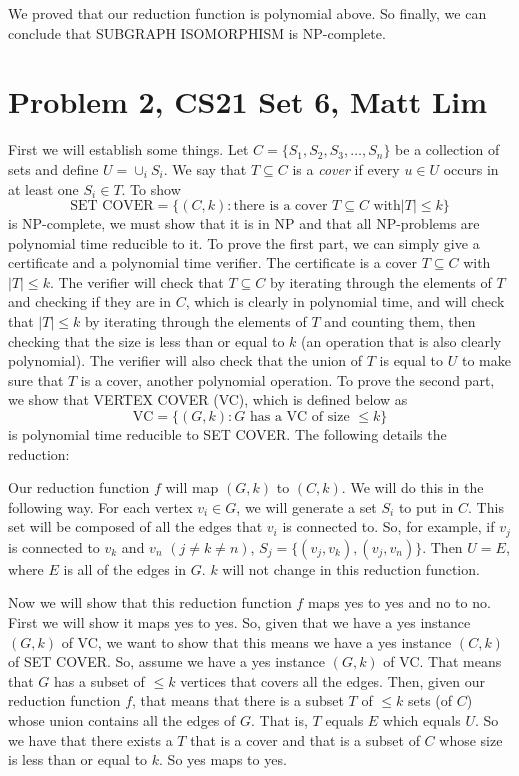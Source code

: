 \documentclass{article}
\begin{document}
We proved that our reduction function is polynomial above. So finally, we can
conclude that SUBGRAPH ISOMORPHISM is NP-complete.
\newpage

\section*{Problem 2, CS21 Set 6, Matt Lim}
First we will establish some things. Let ${C} =
\{S_1, S_2, S_3, \ldots, S_n\}$ be a collection of sets and define $U = \cup_i
S_i$.  We say that $T \subseteq {C}$ is a {\em cover} if every
$u \in U$ occurs in at least one $S_i \in T$.
To show
\[ \text{SET COVER} = \{(C,k) : \text{there is a cover $T \subseteq C$ with
$|T| \leq k$}\} \]
is NP-complete, we must show that it is in NP and that all NP-problems are
polynomial time reducible to it. To prove the first part, we can simply give
a certificate and a polynomial time verifier. The certificate is a cover
$T \subseteq C$ with $|T| \leq k$. The verifier will check that $T \subseteq C$
by iterating through the elements of $T$ and checking if they are in $C$, which
is clearly in polynomial time, and will check that $|T| \leq k$ by iterating
through the elements of $T$ and counting them, then checking that the size
is less than or equal to $k$ (an operation that is also clearly polynomial).
The verifier will also check that the union of $T$
is equal to $U$ to make sure that $T$ is a cover, another polynomial operation.
To prove the second part, we show that VERTEX COVER (VC), which is defined below
as
\[ \text{VC} = \{(G,k) : G \text{ has a VC of size $\leq k$}\} \]
is polynomial time reducible to SET COVER.
The following details the reduction:

Our reduction function $f$ will map $(G,k)$ to $(C,k)$. We will do this in the
following way. For each vertex $v_i \in G$, we will generate a set $S_i$ to
put in $C$. This set will be composed of all the edges that $v_i$ is connected
to. So, for example, if $v_j$ is connected to $v_k$ and $v_n$ $(j \neq k
\neq n)$, $S_j = \{(v_j, v_k), (v_j, v_n)\}$. Then $U = E$, where $E$ is all
of the edges in $G$. $k$ will not change in this reduction function.

Now we will show that this reduction function $f$ maps yes to yes and no
to no. First we will show it maps yes to yes. So, given that we have a yes
instance $(G,k)$ of  VC, we want to show that this means we have a yes instance
$(C,k)$ of SET COVER.
So, assume we have a yes instance $(G,k)$ of VC. That means that $G$
has a subset of $\leq k$ vertices that covers all the edges. Then, given our
reduction function $f$, that means that there is a subset $T$ of $\leq k$ sets
(of $C$) whose union contains all the edges of $G$. That is, $T$ equals $E$ which
equals $U$. So we have that there exists
a $T$ that is a cover and that is a subset of $C$ whose size is less than or
equal to $k$. So yes maps to yes.
\end{document}
